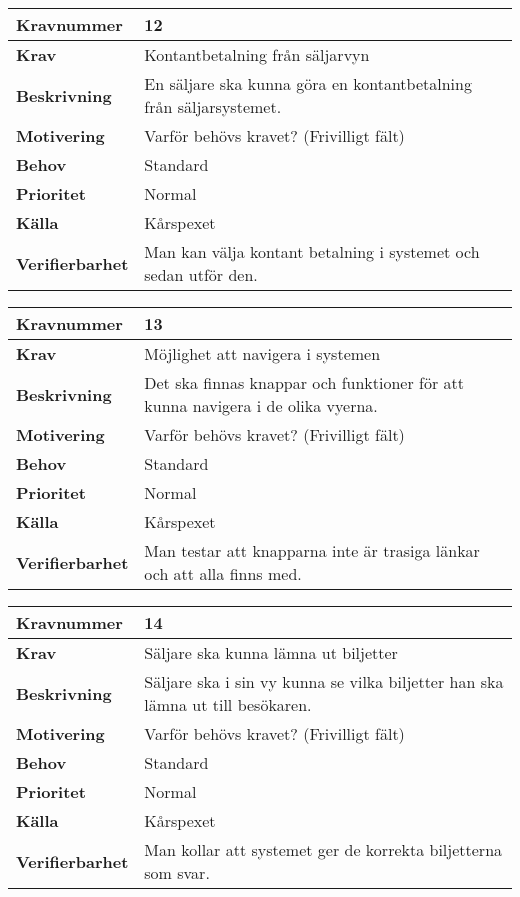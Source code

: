 \documentclass[a4paper, twoside, 11pt, titlepage]{article}
\begin{document}
\begin{tabular} { | p{3cm} | p{12.2cm} | }
	\hline
	\textbf{Kravnummer} & 12  \\
	\hline
	\textbf{Krav} & Kontantbetalning från säljarvyn  \\
	\hline
	\textbf{Beskrivning} & En säljare ska kunna göra en kontantbetalning från säljarsystemet.   \\
	\hline
	\textbf{Motivering} & Varför behövs kravet? (Frivilligt fält)  \\
	\hline
	\textbf{Behov} & Standard  \\
	\hline
	\textbf{Prioritet} & Normal  \\
	\hline
	\textbf{Källa} & Kårspexet  \\
	\hline
	\textbf{Verifierbarhet} & Man kan välja kontant betalning i systemet och sedan utför den.  \\
	\hline
\end{tabular}

\begin{tabular} { | p{3cm} | p{12.2cm} | }
	\hline
	\textbf{Kravnummer} & 13  \\
	\hline
	\textbf{Krav} & Möjlighet att navigera i systemen  \\
	\hline
	\textbf{Beskrivning} & Det ska finnas knappar och funktioner för att kunna navigera i de olika vyerna.  \\
	\hline
	\textbf{Motivering} & Varför behövs kravet? (Frivilligt fält)  \\
	\hline
	\textbf{Behov} & Standard  \\
	\hline
	\textbf{Prioritet} & Normal  \\
	\hline
	\textbf{Källa} & Kårspexet  \\
	\hline
	\textbf{Verifierbarhet} & Man testar att knapparna inte är trasiga länkar och att alla finns med.   \\
	\hline
\end{tabular}

\begin{tabular} { | p{3cm} | p{12.2cm} | }
	\hline
	\textbf{Kravnummer} & 14  \\
	\hline
	\textbf{Krav} & Säljare ska kunna lämna ut biljetter  \\
	\hline
	\textbf{Beskrivning} & Säljare ska i sin vy kunna se vilka biljetter han ska lämna ut till besökaren.  \\
	\hline
	\textbf{Motivering} & Varför behövs kravet? (Frivilligt fält)  \\
	\hline
	\textbf{Behov} & Standard  \\
	\hline
	\textbf{Prioritet} & Normal  \\
	\hline
	\textbf{Källa} & Kårspexet  \\
	\hline
	\textbf{Verifierbarhet} & Man kollar att systemet ger de korrekta biljetterna som svar.   \\
	\hline
\end{tabular}
\end{document}
